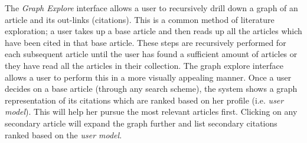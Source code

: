 The \textsl{Graph Explore} interface allows a user to recursively 
drill down a graph of an article and its out-links (citations).
This is a common method of literature exploration; a user takes up a base article and then reads up all the articles which have been cited in that base article.
These steps are recursively performed for each subsequent article until the user has found a sufficient amount of articles or they have read all the articles in their collection.
The graph explore interface allows a user to perform this in a more visually appealing manner.
Once a user decides on a base article (through any search scheme), the system shows a graph representation of its citations which are ranked based on her profile (i.e. \textsl{user model}).
This will help her pursue the most relevant articles first.
Clicking on any secondary article will expand the graph further and 
list secondary citations ranked based on the \textsl{user model}.
